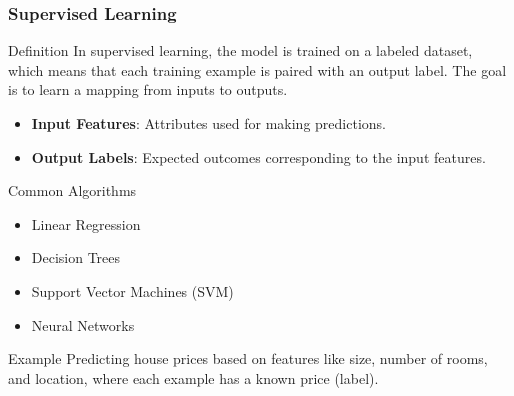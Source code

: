 \documentclass[aspectratio=169]{beamer}
\begin{document}
\begin{frame}[fragile]
    \frametitle{Supervised Learning}
    \begin{block}{Definition}
        In supervised learning, the model is trained on a labeled dataset, which means that each training example is paired with an output label. The goal is to learn a mapping from inputs to outputs.
    \end{block}
    \begin{itemize}
        \item \textbf{Input Features}: Attributes used for making predictions.
        \item \textbf{Output Labels}: Expected outcomes corresponding to the input features.
    \end{itemize}
    \begin{block}{Common Algorithms}
        \begin{itemize}
            \item Linear Regression
            \item Decision Trees
            \item Support Vector Machines (SVM)
            \item Neural Networks
        \end{itemize}
    \end{block}
    \begin{block}{Example}
        Predicting house prices based on features like size, number of rooms, and location, where each example has a known price (label).
    \end{block}
\end{frame}
\end{document}
